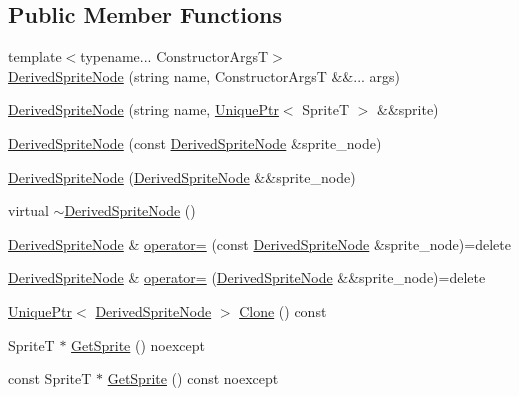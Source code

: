 \subsection*{Public Member Functions}
\begin{DoxyCompactItemize}
\item 
{\footnotesize template$<$typename... Constructor\+ArgsT$>$ }\\\hyperlink{classmage_1_1_derived_sprite_node_a04344d00f39577ef25a307a823e21685}{Derived\+Sprite\+Node} (string name, Constructor\+ArgsT \&\&... args)
\item 
\hyperlink{classmage_1_1_derived_sprite_node_a02376a4d4f35a1b46a1612ccca3e98c2}{Derived\+Sprite\+Node} (string name, \hyperlink{namespacemage_a3316d7143a973e37adf1110f2e80ca31}{Unique\+Ptr}$<$ SpriteT $>$ \&\&sprite)
\item 
\hyperlink{classmage_1_1_derived_sprite_node_af0e8a99b4fb15fd71f4c642999fed2cf}{Derived\+Sprite\+Node} (const \hyperlink{classmage_1_1_derived_sprite_node}{Derived\+Sprite\+Node} \&sprite\+\_\+node)
\item 
\hyperlink{classmage_1_1_derived_sprite_node_a674f95fd5fa8d3372542f2cbbc58f625}{Derived\+Sprite\+Node} (\hyperlink{classmage_1_1_derived_sprite_node}{Derived\+Sprite\+Node} \&\&sprite\+\_\+node)
\item 
virtual \hyperlink{classmage_1_1_derived_sprite_node_a0ff9a3b661a72ae3d200dfe50dc311fc}{$\sim$\+Derived\+Sprite\+Node} ()
\item 
\hyperlink{classmage_1_1_derived_sprite_node}{Derived\+Sprite\+Node} \& \hyperlink{classmage_1_1_derived_sprite_node_a1dd542f0e851b1e289bb127691f0800b}{operator=} (const \hyperlink{classmage_1_1_derived_sprite_node}{Derived\+Sprite\+Node} \&sprite\+\_\+node)=delete
\item 
\hyperlink{classmage_1_1_derived_sprite_node}{Derived\+Sprite\+Node} \& \hyperlink{classmage_1_1_derived_sprite_node_addd4a6c5019df92918e253e41f4e94ac}{operator=} (\hyperlink{classmage_1_1_derived_sprite_node}{Derived\+Sprite\+Node} \&\&sprite\+\_\+node)=delete
\item 
\hyperlink{namespacemage_a3316d7143a973e37adf1110f2e80ca31}{Unique\+Ptr}$<$ \hyperlink{classmage_1_1_derived_sprite_node}{Derived\+Sprite\+Node} $>$ \hyperlink{classmage_1_1_derived_sprite_node_a3a409447de581b0ed39625a9d3beab33}{Clone} () const
\item 
SpriteT $\ast$ \hyperlink{classmage_1_1_derived_sprite_node_a4f380d16fcd3804d08d1f6f42ecc4780}{Get\+Sprite} () noexcept
\item 
const SpriteT $\ast$ \hyperlink{classmage_1_1_derived_sprite_node_a9daf3412c118dcb50f0175d3d00be9bc}{Get\+Sprite} () const noexcept
\end{DoxyCompactItemize}
